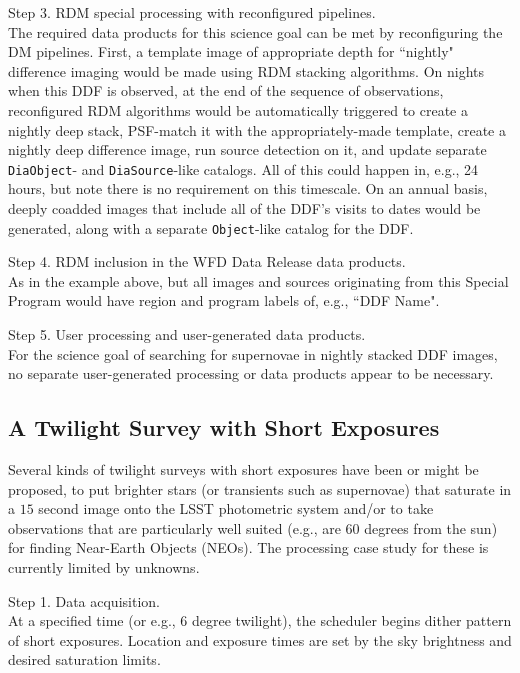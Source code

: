 Step 3. RDM special processing with reconfigured pipelines. \\
The required data products for this science goal can be met by reconfiguring the DM pipelines. 
First, a template image of appropriate depth for ``nightly" difference imaging 
would be made using RDM stacking algorithms. 
On nights when this DDF is observed, at the end of the sequence of observations, 
reconfigured RDM algorithms would be automatically triggered to create a nightly deep stack, 
PSF-match it with the appropriately-made template, 
create a nightly deep difference image, run source detection on it, and update separate 
{\tt DiaObject}- and {\tt DiaSource}-like catalogs.
All of this could happen in, e.g., 24 hours, but note there is no requirement on this timescale.
On an annual basis, deeply coadded images that include all of the DDF's visits to dates would
be generated, along with a separate {\tt Object}-like catalog for the DDF.

Step 4. RDM inclusion in the WFD Data Release data products. \\
As in the example above, but all images and sources originating from this Special Program would have 
region and program labels of, e.g., ``DDF Name".

Step 5. User processing and user-generated data products. \\
For the science goal of searching for supernovae in nightly stacked DDF images, 
no separate user-generated processing or data products appear to be necessary.


\subsection{A Twilight Survey with Short Exposures}\label{ssec:SPCS_Twilight}

Several kinds of twilight surveys with short exposures have been or might be proposed, 
to put brighter stars (or transients such as supernovae) that saturate in a $15$ second image onto the 
LSST photometric system and/or to take observations that are particularly well suited 
(e.g., are 60 degrees from the sun) for finding Near-Earth Objects (NEOs).
The processing case study for these is currently limited by unknowns.

Step 1. Data acquisition. \\
At a specified time (or e.g., 6 degree twilight), the scheduler begins dither pattern of short exposures. 
Location and exposure times are set by the sky brightness and desired saturation limits.

